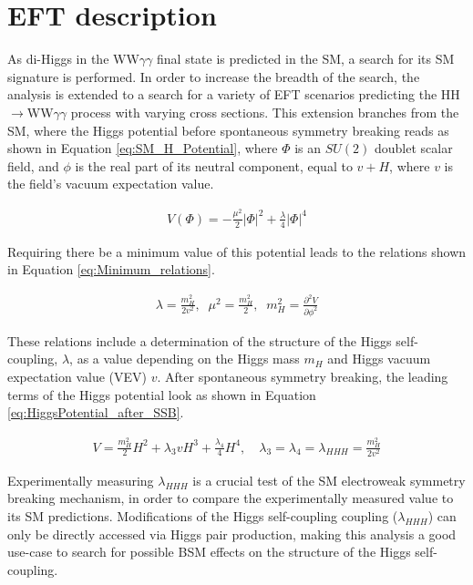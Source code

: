 \section{EFT description} \label{sec:EFT_Description}

As di-Higgs in the WW$\gamma\gamma$ final state is predicted in the SM, a search for its SM signature is performed. In order to increase the breadth of the search, the analysis is extended to a search for a variety of EFT scenarios predicting the HH$\rightarrow$WW$\gamma\gamma$ process with varying cross sections. This extension branches from the SM, where the Higgs potential before spontaneous symmetry breaking reads as shown in Equation \ref{eq:SM_H_Potential}, where $\Phi$ is an $SU(2)$ doublet scalar field, and $\phi$ is the real part of its neutral component, equal to $v + H$, where $v$ is the field's vacuum expectation value.

\begin{eqnarray} \label{eq:SM_H_Potential}
  V(\Phi) = - \frac{\mu^2}{2}\left|\Phi \right|^2
  +\frac{\lambda}{4} \left|\Phi \right|^4
\end{eqnarray}

Requiring there be a minimum value of this potential leads to the relations shown in Equation \ref{eq:Minimum_relations}.

\begin{eqnarray} \label{eq:Minimum_relations}
  \lambda = \frac{m_H^2}{2 v^2}, \;\;  \mu^2 = \frac{m_H^2}{2},
  \;\; m_H^2 = \frac{\partial^2 V}{\partial \phi^2}
   \label{eqm-2}
\end{eqnarray}

These relations include a determination of the structure of the Higgs self-coupling, $\lambda$, as a value depending on the Higgs mass $m_{H}$ and Higgs vacuum expectation value (VEV) $v$. After spontaneous symmetry breaking, the leading terms of the Higgs potential look as shown in Equation \ref{eq:HiggsPotential_after_SSB}. 

\begin{eqnarray} \label{eq:HiggsPotential_after_SSB}
  V = \frac{m_H^2}{2}H^2 + \lambda_3 v H^3 + \frac{\lambda_4}{4} H^4,
\quad
 \lambda_3 = \lambda_4 = \lambda_{HHH} = \frac{m_H^2}{2v^2}
\end{eqnarray}

Experimentally measuring $\lambda_{HHH}$ is a crucial test of the SM electroweak symmetry breaking mechanism, in order to compare the experimentally measured value to its SM predictions. Modifications of the Higgs self-coupling coupling ($\lambda_{HHH}$) can only be directly accessed via Higgs pair production, making this analysis a good use-case to search for possible BSM effects on the structure of the Higgs self-coupling. 

